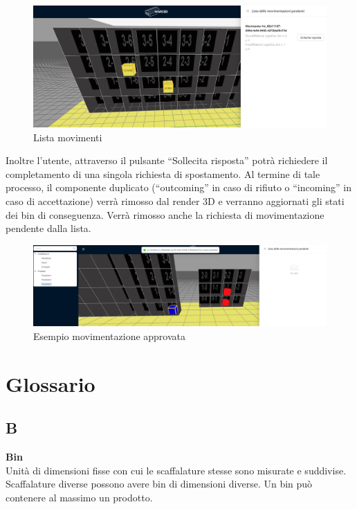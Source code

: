         \begin{figure}[H]
            \centering
            \includegraphics[width=1.0\textwidth]{images/lista_movimenti.png}
            \caption{Lista movimenti}
        \end{figure}
        Inoltre l'utente, attraverso il pulsante ``Sollecita risposta'' potrà richiedere il completamento di una singola richiesta di spostamento.
        Al termine di tale processo, il componente duplicato (``outcoming'' in caso di rifiuto o ``incoming'' in caso di accettazione) verrà rimosso 
        dal render 3D e verranno aggiornati gli stati dei bin di conseguenza. Verrà rimosso anche la richiesta di movimentazione pendente dalla lista.\\
        \begin{figure}[H]
            \centering
            \includegraphics[width=1.0\textwidth]{images/ok_movimento.png}
            \caption{Esempio movimentazione approvata}
        \end{figure}

\newpage
\section{Glossario} \label{sec:glossario}
\subsection*{B}
\textbf{Bin}\\
Unità di dimensioni fisse con cui le scaffalature stesse sono misurate e suddivise. Scaffalature diverse possono avere bin di dimensioni diverse. Un bin può contenere al massimo un prodotto.

